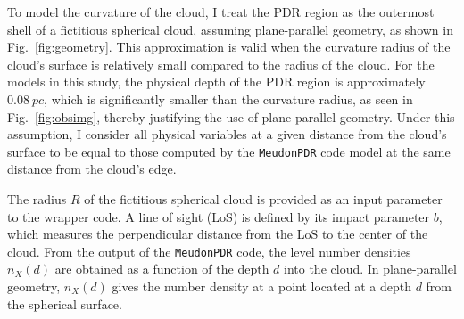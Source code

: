 \documentclass[12pt,a4paper]{article}
\newcommand{\mdpdr}{\texttt{MeudonPDR} code}
\begin{document}
To model the curvature of the cloud, I treat the PDR region as the outermost shell of a fictitious spherical cloud, assuming plane-parallel geometry, as shown in Fig.~\ref{fig:geometry}. This approximation is valid when the curvature radius of the cloud's surface is relatively small compared to the radius of the cloud. For the models in this study, the physical depth of the PDR region is approximately $\qty{0.08}{pc}$, which is significantly smaller than the curvature radius, as seen in Fig.~\ref{fig:obsimg}, thereby justifying the use of plane-parallel geometry. Under this assumption, I consider all physical variables at a given distance from the cloud's surface to be equal to those computed by the \mdpdr{} model at the same distance from the cloud's edge.

The radius $R$ of the fictitious spherical cloud is provided as an input parameter to the wrapper code. A line of sight (LoS) is defined by its impact parameter $b$, which measures the perpendicular distance from the LoS to the center of the cloud. From the output of the \mdpdr{}, the level number densities $n_X(d)$ are obtained as a function of the depth $d$ into the cloud. In plane-parallel geometry, $n_X(d)$ gives the number density at a point located at a depth $d$ from the spherical surface. 
\end{document}
